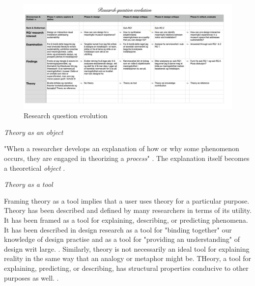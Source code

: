 \begin{figure}[H]
\includegraphics[width=13cm]{pictures/process/rq_evolution.png}
\caption{Research question evolution}
\centering 
\end{figure}



\par \emph{Theory as an object} \par
"When a researcher develops an explanation of how or why some phenomenon occurs, they are engaged in theorizing a \emph{process}" \autocite[p.126]{beck_examining_2016}. The explanation itself becomes a theoretical \emph{object} \autocite[p. 126]{beck_examining_2016}.  


\par \emph{Theory as a tool} \par

Framing theory as a tool implies that a user uses theory for a particular purpose. Theory has been described and defined by many researchers in terms of its utility. It has been framed as a tool for explaining, describing, or predicting phenomena. It has been described in design research as a tool for "binding together" our knowledge of design practise and as a tool for "providing an understanding" of design writ large. \autocite[p. 127]{beck_examining_2016}. Similarly, theory is not necessarily an ideal tool for explaining reality in the same way that an analogy or metaphor might be. THeory, a tool for explaining, predicting, or describing, has structural properties conducive to other purposes as well. \autocite[p. 127]{beck_examining_2016}.


